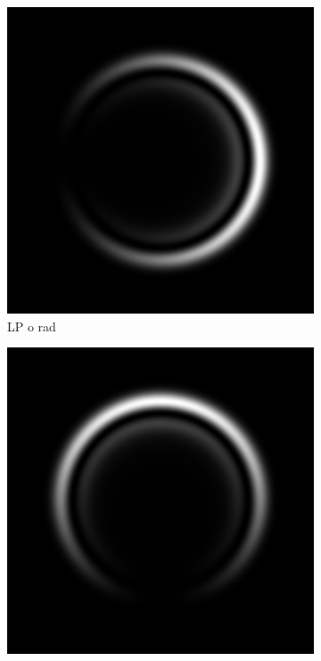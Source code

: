 \documentclass[11pt, a4paper, twoside]{article} %
\begin{document}
\begin{figure}[h!]
\begin{subfigure}[b]{0.245\linewidth}
     \includegraphics[width=\linewidth]{simul22.png}
    \caption{LP o rad}
     \end{subfigure}
 \begin{subfigure}[b]{0.245\linewidth}
     \includegraphics[width=\linewidth]{simul23.png}

\end{subfigure}
\end{figure}
\end{document}
